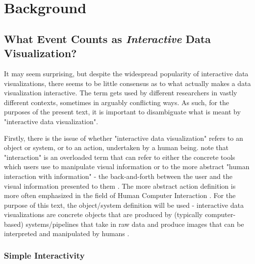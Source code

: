 \documentclass[12pt,a4paper]{article}
\begin{document}
\section{Background}
\label{sec:background}

\subsection{What Event Counts as \textit{Interactive} Data Visualization?}
\label{sec:whatcounts}

It may seem surprising, but despite the widespread popularity of interactive data visualizations, there seems to be little consensus as to what actually makes a data visualization interactive. The term gets used by different researchers in vastly different contexts, sometimes in arguably conflicting ways. As such, for the purposes of the present text, it is important to disambiguate what is meant by "interactive data visualization".

Firstly, there is the issue of whether "interactive data visualization" refers to an object or system, or to an action, undertaken by a human being. \cite{pike2009} note that "interaction" is an overloaded term that can refer to either the concrete tools which users use to manipulate visual information or to the more abstract "human interaction with information" - the back-and-forth between the user and the visual information presented to them \citep[see also][]{yi2007}. The more abstract action definition is more often emphasized in the field of Human Computer Interaction \citep[see e.g.][]{sinha2010}. For the purpose of this text, the object/system definition will be used - interactive data visualizations are concrete objects that are produced by (typically computer-based) systems/pipelines that take in raw data and produce images that can be interpreted and manipulated by humans \citep{brodbeck2009}.

\subsubsection{Simple Interactivity}
\end{document}
